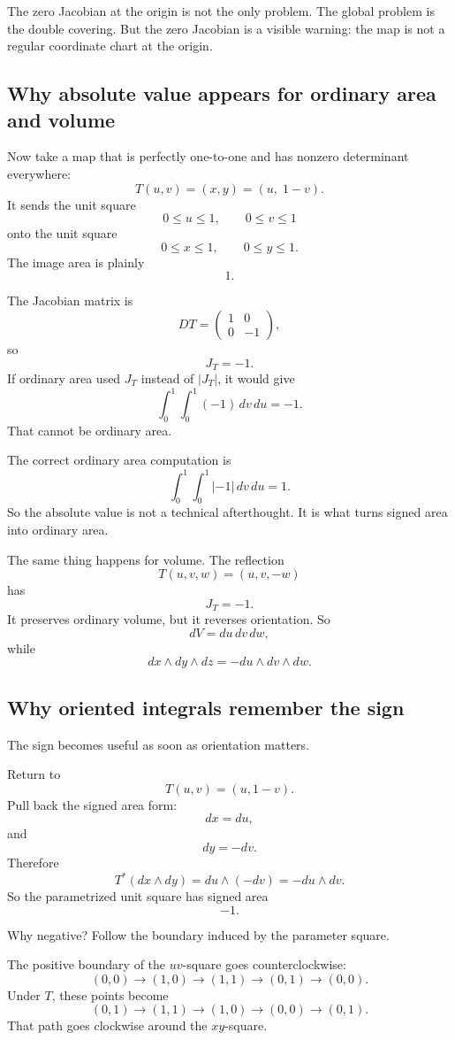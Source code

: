 The zero Jacobian at the origin is not the only problem.  The global problem is the
double covering.  But the zero Jacobian is a visible warning: the map is not a regular
coordinate chart at the origin.

\subsection{Why absolute value appears for ordinary area and volume}

Now take a map that is perfectly one-to-one and has nonzero determinant everywhere:
\[
    T(u,v)=(x,y)=(u,\;1-v).
\]
It sends the unit square
\[
    0\le u\le1,\qquad 0\le v\le1
\]
onto the unit square
\[
    0\le x\le1,\qquad 0\le y\le1.
\]
The image area is plainly
\[
    1.
\]

The Jacobian matrix is
\[
    DT=
    \begin{pmatrix}
        1&0\\
        0&-1
    \end{pmatrix},
\]
so
\[
    J_T=-1.
\]
If ordinary area used \(J_T\) instead of \(|J_T|\), it would give
\[
    \int_0^1\int_0^1 (-1)\,dv\,du=-1.
\]
That cannot be ordinary area.

The correct ordinary area computation is
\[
    \int_0^1\int_0^1 |{-1}|\,dv\,du=1.
\]
So the absolute value is not a technical afterthought.  It is what turns signed area
into ordinary area.

The same thing happens for volume.  The reflection
\[
    T(u,v,w)=(u,v,-w)
\]
has
\[
    J_T=-1.
\]
It preserves ordinary volume, but it reverses orientation.  So
\[
    dV=du\,dv\,dw,
\]
while
\[
    dx\wedge dy\wedge dz=-du\wedge dv\wedge dw.
\]

\subsection{Why oriented integrals remember the sign}

The sign becomes useful as soon as orientation matters.

Return to
\[
    T(u,v)=(u,1-v).
\]
Pull back the signed area form:
\[
    dx=du,
\]
and
\[
    dy=-dv.
\]
Therefore
\[
    T^*(dx\wedge dy)=du\wedge(-dv)=-du\wedge dv.
\]
So the parametrized unit square has signed area
\[
    -1.
\]

Why negative?  Follow the boundary induced by the parameter square.

The positive boundary of the \(uv\)-square goes counterclockwise:
\[
    (0,0)\to(1,0)\to(1,1)\to(0,1)\to(0,0).
\]
Under \(T\), these points become
\[
    (0,1)\to(1,1)\to(1,0)\to(0,0)\to(0,1).
\]
That path goes clockwise around the \(xy\)-square.

